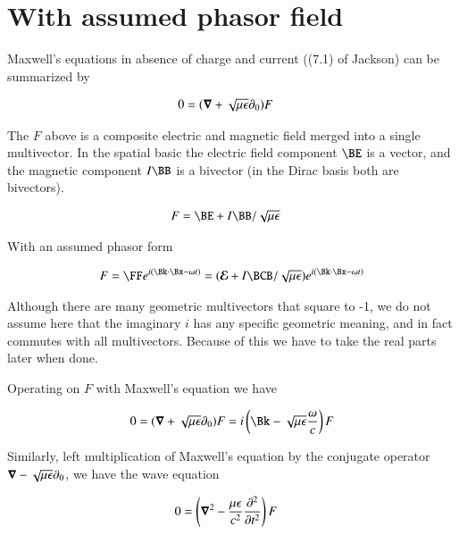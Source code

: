 \section{With assumed phasor field}

Maxwell's equations in absence of charge and current ((7.1) of Jackson) can be summarized by 

\begin{align}\label{eqn:transverseWave:foo1}
0 &= (\boldsymbol{\nabla} + \sqrt{\mu\epsilon}\partial_0) F 
\end{align}

The $F$ above is a composite electric and magnetic field merged into a single multivector.  In the spatial basic the electric field component $\BE$ is a vector, and the magnetic component $I\BB$ is a bivector (in the Dirac basis both are bivectors).

\begin{align}\label{eqn:transverseWave:foo0}
F &= \BE + I \BB/\sqrt{\mu\epsilon}
\end{align}

With an assumed phasor form

\begin{align}\label{eqn:transverseWave:foo2}
F = \FF e^{ i(\Bk \cdot \Bx - \omega t) } = (\EE + I\BCB/\sqrt{\mu\epsilon}) e^{ i(\Bk \cdot \Bx - \omega t) }
\end{align}

Although there are many geometric multivectors that square to -1, we do not assume here that the imaginary $i$ has any specific geometric meaning, and in fact commutes with all multivectors.  Because of this we have to take the real parts later when done.

Operating on $F$ with Maxwell's equation we have 

\begin{align}\label{eqn:transverseWave:foo3}
0 = (\spacegrad + \sqrt{\mu\epsilon}\partial_0) F = i \left( \Bk - \sqrt{\mu\epsilon}\frac{\omega}{c} \right) F 
\end{align}

Similarly, left multiplication of Maxwell's equation by the conjugate operator $\boldsymbol{\nabla} - \sqrt{\mu\epsilon}\partial_0$, we have the wave equation

\begin{align}\label{eqn:transverseWave:foo4}
0 &= \left(\boldsymbol{\nabla}^2 - \frac{\mu\epsilon}{c^2}\frac{\partial^2}{\partial t^2}\right) F 
\end{align}

